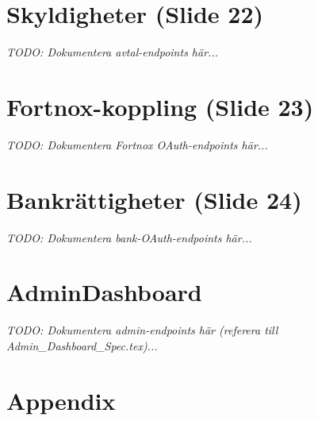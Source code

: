 \documentclass[12pt,a4paper]{article}
\begin{document}
\section{Skyldigheter (Slide 22)}

\textit{TODO: Dokumentera avtal-endpoints här...}

\newpage


\section{Fortnox-koppling (Slide 23)}

\textit{TODO: Dokumentera Fortnox OAuth-endpoints här...}

\newpage


\section{Bankrättigheter (Slide 24)}

\textit{TODO: Dokumentera bank-OAuth-endpoints här...}

\newpage


\section{AdminDashboard}

\textit{TODO: Dokumentera admin-endpoints här (referera till Admin\_Dashboard\_Spec.tex)...}

\newpage

\section{Appendix}
\end{document}
